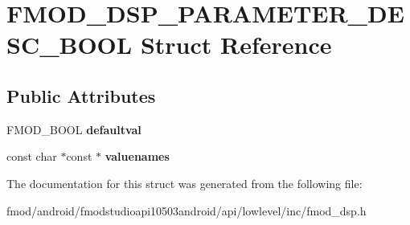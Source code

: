 \hypertarget{struct_f_m_o_d___d_s_p___p_a_r_a_m_e_t_e_r___d_e_s_c___b_o_o_l}{\section{F\+M\+O\+D\+\_\+\+D\+S\+P\+\_\+\+P\+A\+R\+A\+M\+E\+T\+E\+R\+\_\+\+D\+E\+S\+C\+\_\+\+B\+O\+O\+L Struct Reference}
\label{struct_f_m_o_d___d_s_p___p_a_r_a_m_e_t_e_r___d_e_s_c___b_o_o_l}
}
\subsection*{Public Attributes}
\begin{DoxyCompactItemize}
\item 
\hypertarget{struct_f_m_o_d___d_s_p___p_a_r_a_m_e_t_e_r___d_e_s_c___b_o_o_l_a20622323e1938e829be8d2a45743f7b2}{F\+M\+O\+D\+\_\+\+B\+O\+O\+L {\bfseries defaultval}}\label{struct_f_m_o_d___d_s_p___p_a_r_a_m_e_t_e_r___d_e_s_c___b_o_o_l_a20622323e1938e829be8d2a45743f7b2}

\item 
\hypertarget{struct_f_m_o_d___d_s_p___p_a_r_a_m_e_t_e_r___d_e_s_c___b_o_o_l_a094d812feefeed547ac55e966aade752}{const char $\ast$const $\ast$ {\bfseries valuenames}}\label{struct_f_m_o_d___d_s_p___p_a_r_a_m_e_t_e_r___d_e_s_c___b_o_o_l_a094d812feefeed547ac55e966aade752}

\end{DoxyCompactItemize}


The documentation for this struct was generated from the following file\+:\begin{DoxyCompactItemize}
\item 
fmod/android/fmodstudioapi10503android/api/lowlevel/inc/fmod\+\_\+dsp.\+h\end{DoxyCompactItemize}
